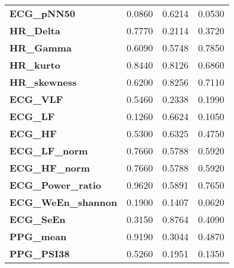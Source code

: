 \begin{footnotesize}
\begin{longtable}[htbp]{m{4.5cm}<{\raggedright}m{3cm}<{\raggedright}m{3cm}<{\raggedright}m{2.2cm}<{\raggedright}}
    { \textbf{ECG\_pNN50}}             & { 0.0860}                     & { 0.6214}                     & { 0.0530}                     \\
    { \textbf{HR\_Delta}}              & { 0.7770}                     & { 0.2114}                     & { 0.3720}                     \\
    { \textbf{HR\_Gamma}}              & { 0.6090}                     & { 0.5748}                     & { 0.7850}                     \\
    { \textbf{HR\_kurto}}              & { 0.8440}                     & { 0.8126}                     & { 0.6860}                     \\
    { \textbf{HR\_skewness}}           & { 0.6200}                     & { 0.8256}                     & { 0.7110}                     \\
    { \textbf{ECG\_VLF}}               & { 0.5460}                     & { 0.2338}                     & { 0.1990}                     \\
    { \textbf{ECG\_LF}}                & { 0.1260}                     & { 0.6624}                     & { 0.1050}                     \\
    { \textbf{ECG\_HF}}                & { 0.5300}                     & { 0.6325}                     & { 0.4750}                     \\
    { \textbf{ECG\_LF\_norm}}          & { 0.7660}                     & { 0.5788}                     & { 0.5920}                     \\
    { \textbf{ECG\_HF\_norm}}          & { 0.7660}                     & { 0.5788}                     & { 0.5920}                     \\
    { \textbf{ECG\_Power\_ratio}}      & { 0.9620}                     & { 0.5891}                     & { 0.7650}                     \\
    { \textbf{ECG\_WeEn\_shannon}}     & { 0.1900}                     & { 0.1407}                     & { 0.0620}                     \\
    { \textbf{ECG\_SeEn}}              & { 0.3150}                     & { 0.8764}                     & { 0.4090}                     \\
    { \textbf{PPG\_mean}}              & { 0.9190}                     & { 0.3044}                     & { 0.4870}                     \\
    { \textbf{PPG\_PSI38}}             & { 0.5260}                     & { 0.1951}                     & { 0.1350}                     \\

\end{longtable}
\end{footnotesize}
